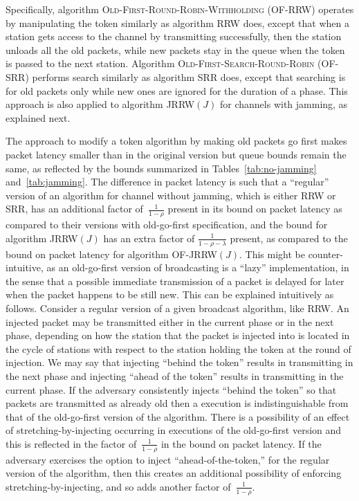 \documentclass[11pt]{article}
\begin{document}
Specifically, algorithm \textsc{Old-First-Round-Robin-Withholding} (\textsc{OF-RRW}) operates by  manipulating the token similarly as algorithm \textsc{RRW} does, except that when a station gets access to the channel by transmitting successfully, then the station unloads all the old packets, while new packets stay in the queue when the token is passed to the next station.
Algorithm \textsc{Old-First-Search-Round-Robin} (\textsc{OF-SRR}) performs search  similarly as algorithm \textsc{SRR} does, except that searching is for old packets only while new ones are ignored for the duration of a phase.
This approach is also applied to algorithm \textsc{JRRW$(J)$} for channels with jamming, as explained next.

The approach to modify a token algorithm by making old packets go first makes packet latency smaller than in the original version but queue bounds remain the same, as reflected by the bounds summarized in Tables~\ref{tab:no-jamming} and~\ref{tab:jamming}.
The difference in packet latency is such that a ``regular'' version of an algorithm for channel without jamming, which is either \textsc{RRW} or \textsc{SRR}, has an additional factor of~$\frac{1}{1-\rho}$ present in its bound on packet latency as compared to their versions with old-go-first specification, and the bound for algorithm \textsc{JRRW$(J)$} has an extra factor of $\frac{1}{1-\rho-\lambda }$ present, as compared to the bound on packet latency for algorithm \textsc{OF-JRRW$(J)$}.
This might be counter-intuitive, as an old-go-first version of broadcasting is a ``lazy'' implementation, in the sense that a possible immediate transmission of a packet is delayed for later when the packet happens to be still new.
This can be explained intuitively as follows.
Consider a regular version of a given broadcast algorithm, like \textsc{RRW}.
An injected packet may be transmitted either in the current phase or in the next phase, depending on how the station that the packet is injected into is located in the cycle of stations with respect to the station holding the token at the round of injection.
We may say that injecting ``behind the token'' results in transmitting in the next phase and injecting ``ahead of the token'' results in transmitting in the current phase. 
If the adversary consistently injects ``behind the token'' so that packets are transmitted as already old then a execution is indistinguishable from that of the old-go-first version of the algorithm.  
There is a possibility of an effect of stretching-by-injecting occurring in executions of the old-go-first version and this is reflected in the factor of~$\frac{1}{1-\rho}$ in the bound on packet latency.
If the adversary exercises the option to inject ``ahead-of-the-token,''  for the regular version of the algorithm, then this creates an additional possibility of enforcing  stretching-by-injecting, and so adds another factor of~$\frac{1}{1-\rho}$.
\end{document}

